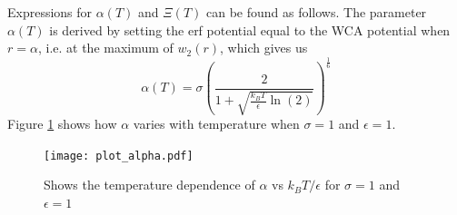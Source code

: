 \documentclass[double,12pt]{beavtex}
\begin{document}
Expressions for $\alpha(T)$ and $\Xi(T)$  can be found as follows. 
The parameter $\alpha(T)$ is derived by setting 
the erf potential equal to the WCA potential when $r=\alpha$, i.e. at the
maximum of $w_2(r)$,
which gives us
\begin{equation}\label{alphaT}
	{\alpha(T)=\sigma\left(\frac{2}{1+\sqrt{\frac{k_BT}{\epsilon}\ln(2)}}\right)^\frac{1}{6}}
\end{equation} 
Figure \ref{fig:alphaXivsT} shows how $\alpha$ varies with temperature 
when $\sigma=1$ and $\epsilon=1$.    
\begin{figure}[h!]
    \centering
    \texttt{[image: plot\_alpha.pdf]}
    \caption{Shows the temperature dependence of $\alpha$ vs $k_BT/{\epsilon}$ 
    for $\sigma=1$ and $\epsilon=1$}
    \label{fig:alphaXivsT}
  \end{figure}
\end{document}

